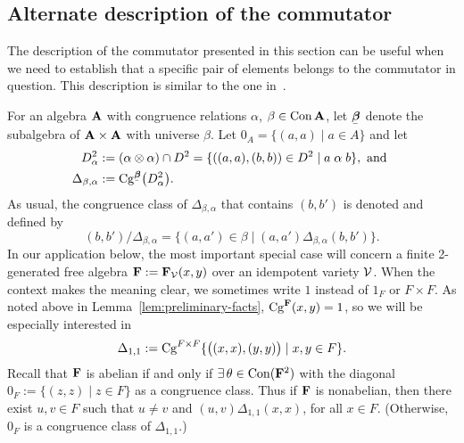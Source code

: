 \subsection{Alternate description of the commutator}
\label{sec:altern-descr-comm}
The description of the commutator presented in this section can be 
useful when we need to establish that a specific pair of elements
belongs to the commutator in question. This  description is
similar to the one in~\cite[p.~930]{MR1358491}.

For an algebra $\mathbf{A}$ with congruence relations $\alpha$, $\beta\in \operatorname{Con}\mathbf{A}$,
let $\bbeta$ denote the subalgebra of $\mathbf{A}\times \mathbf{A}$ with universe 
$\beta$.
Let $0_A = \{(a,a) \mid a\in A\}$ and let
\begin{align}
D^2_\alpha&:=(\alpha \otimes \alpha) \cap D^2 = \{((a,a), (b,b)) \in D^2 \mid
a\alphar b\}, \text{ and }\\
\Delta_{\beta, \alpha} &:= \Cg^{\bbeta}\bigl(D^2_\alpha \bigr). 
\end{align}
As usual, the congruence class of $\Delta_{\beta, \alpha}$ that contains
$(b,b')$ is denoted and defined by 
\[
(b,b')/\Delta_{\beta,\alpha} = \{(a,a') \in \beta \mid (a,a') \mathrel{\Delta_{\beta,\alpha}} (b,b')\}.
\]
In our application below, the most important special case will concern 
a finite 2-generated free algebra $\mathbf{F} := \mathbf{F}_{\mathcal{V}}(x,y)$ over an idempotent
variety $\mathcal{V}$. 
When the context makes the meaning clear, we sometimes write $1$ instead of
$1_F$ or $F \times F$. 
As noted above in Lemma~\ref{lem:preliminary-facts}, 
$\operatorname{Cg}^{\mathbf{F}}(x,y) = 1$, so we will be especially interested in 
\begin{equation}
\label{eq:11}  
\Delta_{1, 1} := \operatorname{Cg}^{F\times F}\{\bigl((x,x), (y,y)\bigr) \mid x, y \in F\}.
\end{equation}
Recall that $\mathbf{F}$ is abelian if and only if
 $\exists\, \theta \in \operatorname{Con} (\mathbf{F}^2)$ with the diagonal $0_F:= \{(z,z)\mid z \in F\}$ 
 as a congruence class. 
 Thus if $\mathbf{F}$ is nonabelian, then there exist
 $u, v\in F$ such that
 $u \neq v$ and $(u,v)\mathrel{\Delta_{1,1}}(x,x)$,
 for all $x\in F$. 
 (Otherwise, $0_F$ is a congruence class of $\Delta_{1,1}$.)

